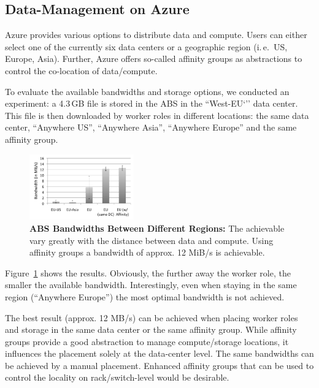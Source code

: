 \documentclass[conference,final]{IEEEtran}
\newcommand{\up}{\vspace*{-1em}}
\newcommand{\jhanote}[1]{ {\textcolor{red} { ***SJ: #1 }}}
\newcommand{\jhanote}[1]{}
\begin{document}
\subsection{Data-Management on Azure}
\up Azure provides various options to distribute data and
compute. Users can either select one of the currently six data centers
or a geographic region (i.\,e.\ US, Europe, Asia). Further, Azure
offers so-called affinity groups as abstractions to control the
co-location of data/compute.

To evaluate the available bandwidths and storage options, we conducted
an experiment: a 4.3\,GB file is stored in the ABS in 
the ``West-EU`'' data center. This file is then
downloaded by worker roles in different locations: the same data center,
``Anywhere US'', ``Anywhere Asia'', ``Anywhere Europe'' and 
the same affinity group.

\begin{figure}[t]
    \centering
        \includegraphics[width=0.4\textwidth]{performance/azure-data-transfer.pdf}
          \caption{\textbf{ABS Bandwidths Between
            Different Regions:} The achievable vary greatly with the
          distance between data and compute. Using affinity groups a
          bandwidth of approx. 12 MiB/s is achievable.}
    \label{fig:performance_azure-data-transfer}
\end{figure}
Figure~\ref{fig:performance_azure-data-transfer} shows the results.
Obviously, the further away the worker role, the smaller the available
bandwidth. Interestingly, even when staying in the same region
(``Anywhere Europe'') the most optimal bandwidth is not achieved.

The best result (approx. 12 MB/s) %
can be achieved when placing worker roles and storage in the same data
center or the same affinity group. While affinity groups provide a
good abstraction to manage compute/storage locations, it influences
the placement solely at the data-center level. The same bandwidths can
be achieved by a manual placement. Enhanced affinity groups that can
be used to control the locality on rack/switch-level would be
desirable.
\end{document}
